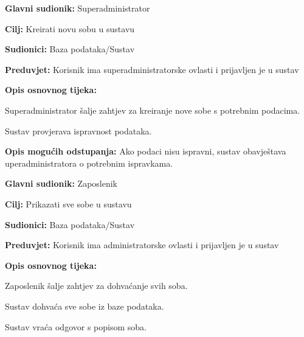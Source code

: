 \noindent {}
\begin{packed_item}
	
	\item \textbf{Glavni sudionik: }Superadministrator
	\item  \textbf{Cilj:} Kreirati novu sobu u sustavu
	\item  \textbf{Sudionici:} Baza podataka/Sustav
	\item  \textbf{Preduvjet:} Korisnik ima superadministratorske ovlasti i prijavljen je u sustav
	\item  \textbf{Opis osnovnog tijeka:}
	
	\item[] \begin{packed_enum}
		
		\item Superadministrator šalje zahtjev za kreiranje nove sobe s potrebnim podacima.
		\item Sustav provjerava ispravnost podataka.
		
	\end{packed_enum}
	
	\item  \textbf{Opis mogućih odstupanja:} Ako podaci nisu ispravni, sustav obavještava uperadministratora o potrebnim ispravkama.
	
	
\end{packed_item}

\noindent {}
\begin{packed_item}
	
	\item \textbf{Glavni sudionik: }Zaposlenik
	\item  \textbf{Cilj:} Prikazati sve sobe u sustavu
	\item  \textbf{Sudionici:} Baza podataka/Sustav
	\item  \textbf{Preduvjet:} Korisnik ima administratorske ovlasti i prijavljen je u sustav
	\item  \textbf{Opis osnovnog tijeka:}
	
	\item[] \begin{packed_enum}
		
		\item Zaposlenik šalje zahtjev za dohvaćanje svih soba.
		\item Sustav dohvaća sve sobe iz baze podataka.
		\item Sustav vraća odgovor s popisom soba.
		
	\end{packed_enum}
	
	
\end{packed_item}

